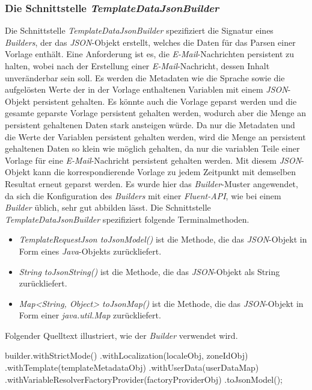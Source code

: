 \subsubsection{Die Schnittstelle \emph{TemplateDataJsonBuilder}}
\label{sec:templateDataJsonBuilder}
Die Schnittstelle \emph{TemplateDataJsonBuilder} spezifiziert die Signatur eines \emph{Builders}, der das \emph{JSON}-Objekt erstellt, welches die Daten für das Parsen einer Vorlage enthält. Eine Anforderung ist es, die \emph{E-Mail}-Nachrichten persistent zu halten, wobei nach der Erstellung einer \emph{E-Mail}-Nachricht, dessen Inhalt unveränderbar sein soll. Es werden die Metadaten wie die Sprache sowie die aufgelösten Werte der in der Vorlage enthaltenen Variablen mit einem \emph{JSON}-Objekt persistent gehalten. Es könnte auch die Vorlage geparst werden und die gesamte geparste Vorlage persistent gehalten werden, wodurch aber die Menge an persistent gehaltenen Daten stark ansteigen würde. Da nur die Metadaten und die Werte der Variablen persistent gehalten werden, wird die Menge an persistent gehaltenen Daten so klein wie möglich gehalten, da nur die variablen Teile einer Vorlage für eine \emph{E-Mail}-Nachricht persistent gehalten werden. Mit diesem \emph{JSON}-Objekt kann die korrespondierende Vorlage zu jedem Zeitpunkt mit demselben Resultat erneut geparst werden.
\newline
\newline
Es wurde hier das \emph{Builder}-Muster angewendet, da sich die Konfiguration des \emph{Builders} mit einer \emph{Fluent-API}, wie bei einem \emph{Builder} üblich, sehr gut abbilden lässt. Die Schnittstelle \emph{TemplateDataJsonBuilder} spezifiziert folgende Terminalmethoden.
\begin{itemize}
	\item\emph{TemplateRequestJson toJsonModel()} ist die Methode, die das \emph{JSON}-Objekt in Form eines \emph{Java}-Objekts zurückliefert.
	\item\emph{String toJsonString()} ist die Methode, die das \emph{JSON}-Objekt als String zurückliefert.
	\item\emph{Map<String, Object> toJsonMap()} ist die Methode, die das \emph{JSON}-Objekt in Form einer \emph{java.util.Map} zurückliefert.
\end{itemize}  
Folgender Quelltext illustriert, wie der \emph{Builder} verwendet wird.
\begin{JavaCode}[numbers=none]
builder.withStrictMode() 
       .withLocalization(localeObj, zoneIdObj)
       .withTemplate(templateMetadataObj)
       .withUserData(userDataMap)
       .withVariableResolverFactoryProvider(factoryProviderObj)
       .toJsonModel();
\end{JavaCode}
